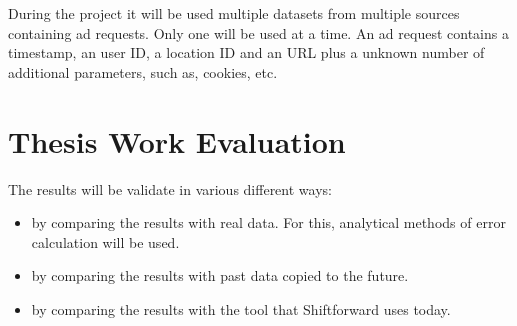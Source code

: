 During the project it will be used multiple datasets from multiple sources containing ad requests. 
Only one will be used at a time. 
An ad request contains a timestamp, an user ID, a location ID and an URL plus a unknown number of
additional parameters, such as, cookies, etc.

\section{Thesis Work Evaluation}

The results will be validate in various different ways:
\begin{itemize}
    \item by comparing the results with real data. For this, analytical methods of error calculation will be used.
    \item by comparing the results with past data copied to the future.
    \item by comparing the results with the tool that Shiftforward uses today.
\end{itemize}
